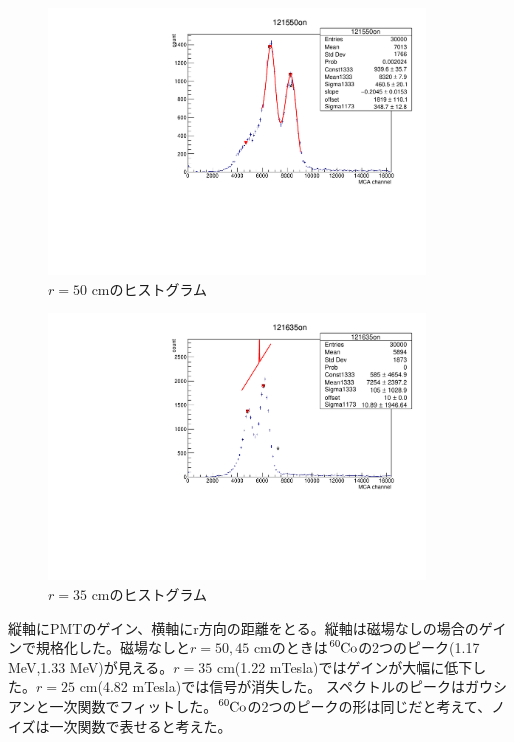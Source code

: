 \begin{figure}[H]
	\centering
		\includegraphics[angle=-90,width=10cm]{fig/iguchi/121550on.pdf}
	\caption{$r=50$ cmのヒストグラム}
	\label{hist50}
\end{figure}
\begin{figure}[H]
	\centering
		\includegraphics[angle=-90,width=10cm]{fig/iguchi/121635on.pdf}
	\caption{$r=35$ cmのヒストグラム}
	\label{hist35}
\end{figure}
縦軸にPMTのゲイン、横軸にr方向の距離をとる。縦軸は磁場なしの場合のゲインで規格化した。磁場なしと$r=50,45$ cmのときは$\ce{^{60}Co}$の2つのピーク(1.17 MeV,1.33 MeV)が見える。$r=35$ cm(1.22 mTesla)ではゲインが大幅に低下した。$r=25$ cm(4.82 mTesla)では信号が消失した。
スペクトルのピークはガウシアンと一次関数でフィットした。$\ce{^{60}Co}$の2つのピークの形は同じだと考えて、ノイズは一次関数で表せると考えた。

